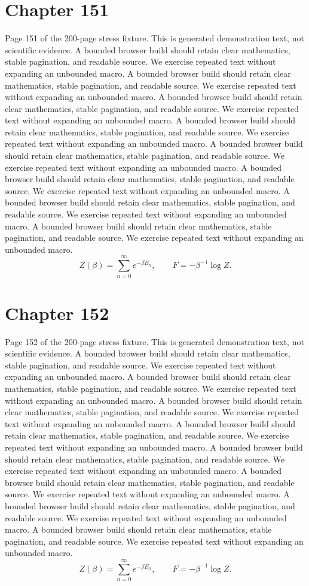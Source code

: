 \documentclass[11pt]{article}
\begin{document}
\section*{Chapter 151}
Page 151 of the 200-page stress fixture. This is generated demonstration text, not scientific evidence.
A bounded browser build should retain clear mathematics, stable pagination, and readable source. We exercise repeated text without expanding an unbounded macro.
A bounded browser build should retain clear mathematics, stable pagination, and readable source. We exercise repeated text without expanding an unbounded macro.
A bounded browser build should retain clear mathematics, stable pagination, and readable source. We exercise repeated text without expanding an unbounded macro.
A bounded browser build should retain clear mathematics, stable pagination, and readable source. We exercise repeated text without expanding an unbounded macro.
A bounded browser build should retain clear mathematics, stable pagination, and readable source. We exercise repeated text without expanding an unbounded macro.
A bounded browser build should retain clear mathematics, stable pagination, and readable source. We exercise repeated text without expanding an unbounded macro.
A bounded browser build should retain clear mathematics, stable pagination, and readable source. We exercise repeated text without expanding an unbounded macro.
A bounded browser build should retain clear mathematics, stable pagination, and readable source. We exercise repeated text without expanding an unbounded macro.
\[Z(\beta)=\sum_{n=0}^{\infty}e^{-\beta E_n},\qquad F=-\beta^{-1}\log Z.\]
\newpage
\section*{Chapter 152}
Page 152 of the 200-page stress fixture. This is generated demonstration text, not scientific evidence.
A bounded browser build should retain clear mathematics, stable pagination, and readable source. We exercise repeated text without expanding an unbounded macro.
A bounded browser build should retain clear mathematics, stable pagination, and readable source. We exercise repeated text without expanding an unbounded macro.
A bounded browser build should retain clear mathematics, stable pagination, and readable source. We exercise repeated text without expanding an unbounded macro.
A bounded browser build should retain clear mathematics, stable pagination, and readable source. We exercise repeated text without expanding an unbounded macro.
A bounded browser build should retain clear mathematics, stable pagination, and readable source. We exercise repeated text without expanding an unbounded macro.
A bounded browser build should retain clear mathematics, stable pagination, and readable source. We exercise repeated text without expanding an unbounded macro.
A bounded browser build should retain clear mathematics, stable pagination, and readable source. We exercise repeated text without expanding an unbounded macro.
A bounded browser build should retain clear mathematics, stable pagination, and readable source. We exercise repeated text without expanding an unbounded macro.
\[Z(\beta)=\sum_{n=0}^{\infty}e^{-\beta E_n},\qquad F=-\beta^{-1}\log Z.\]
\newpage
\end{document}

